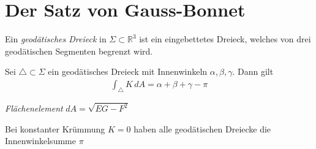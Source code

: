 \documentclass[../main.tex]{subfiles}
\begin{document}
\section{Der Satz von Gauss-Bonnet}

\begin{definition}
    Ein \emph{geodätisches Dreieck} in $\Sigma \subset \mathbb{R}^3$ ist ein eingebettetes Dreieck, welches von drei geodätischen Segmenten begrenzt wird.
\end{definition}

\begin{theorem}
    Sei $\triangle \subset \Sigma$ ein geodätisches Dreieck mit Innenwinkeln $\alpha, \beta, \gamma$. Dann gilt
    \begin{align*}
        \int_{\triangle} K \,dA = \alpha + \beta + \gamma - \pi 
    \end{align*}
\end{theorem}
 
\begin{recall}
    \emph{Flächenelement} $dA = \sqrt{EG-F^{2}}$ 
\end{recall}

\begin{remark}
    Bei konstanter Krümmung $K = 0$ haben alle geodätischen Dreiecke die Innenwinkelsumme $\pi$
\end{remark}

\begin{geometric}
\end{geometric}
\end{document}
